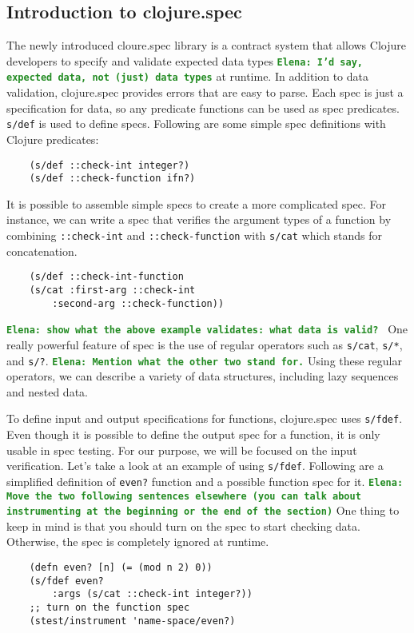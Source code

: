 \documentclass[12pt]{article}
\newcommand{\comment}[1]{{\bf \tt  {#1}}}
\newcommand{\emcomment}[1]{\textcolor{ForestGreen}{\comment{Elena: {#1}}}}
\begin{document}
	\subsection{Introduction to clojure.spec}
	The newly introduced cloure.spec library is a contract system that allows Clojure developers to specify and validate expected data 
	types \emcomment{I'd say, expected data, not (just) data types} at runtime. In addition to data validation, clojure.spec provides errors that are easy to parse. Each spec is just a 				 
	specification for data, so any predicate functions can be used as spec predicates. \texttt{s/def} is used to define specs. Following are 
	some simple spec definitions with Clojure predicates:
	\begin{verbatim}
	(s/def ::check-int integer?)
	(s/def ::check-function ifn?)
	\end{verbatim}
	It is possible to assemble simple specs to create a more complicated spec. For instance, we can write a spec that verifies 
	the argument types of a function by combining \texttt{::check-int} and \texttt{::check-function} with \texttt{s/cat} 
	which stands for concatenation. 
	\begin{verbatim}
	(s/def ::check-int-function 
	(s/cat :first-arg ::check-int
    	:second-arg ::check-function))
	\end{verbatim}
	\emcomment{show what the above example validates: what data is valid? }
	One really powerful feature of spec is the use of regular operators such as \texttt{s/cat}, \texttt{s/*}, and \texttt{s/?}. 
	\emcomment{Mention what the other two stand for.}
	Using 
	these regular operators, we can describe a variety of data structures, including lazy sequences and nested data. 

	To define 
	input and output specifications for functions, clojure.spec uses \texttt{s/fdef}. Even though it is possible to define the output spec 
	for a function, it is only usable in spec testing. For our purpose, we will be focused on the input verification. Let's take a 
	look at an example of using \texttt{s/fdef}. Following are a simplified definition of \texttt{even?} function and a possible function spec for it. 
	\emcomment{Move the two following sentences elsewhere (you can talk about instrumenting at the beginning or the end of the section)}
	One thing to keep in mind is that you should turn on the spec to start checking data. Otherwise, the spec is completely 
	ignored at runtime.
	\begin{verbatim}
	(defn even? [n] (= (mod n 2) 0))
	(s/fdef even?
    	:args (s/cat ::check-int integer?))
	;; turn on the function spec
	(stest/instrument 'name-space/even?)
	\end{verbatim}
	
\end{document}
